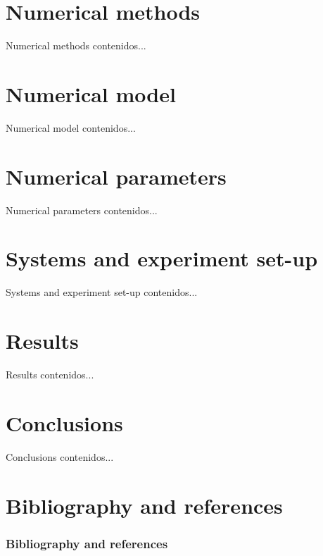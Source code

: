 \documentclass[11pt]{beamer}
\begin{document}
	\section{Numerical methods}
		\begin{frame}{Numerical methods}
		contenidos...
		\end{frame}
	\section{Numerical model}
		\begin{frame}{Numerical model}
		contenidos...
		\end{frame}
	\section{Numerical parameters}
		\begin{frame}{Numerical parameters}
		contenidos...
		\end{frame}
	\section{Systems and experiment set-up}
		\begin{frame}{Systems and experiment set-up}
		contenidos...
		\end{frame}
	\section{Results}
		\begin{frame}{Results}
		contenidos...
		\end{frame}
	\section{Conclusions}
		\begin{frame}{Conclusions}
		contenidos...
		\end{frame}
	\section{Bibliography and references}
		\begin{frame}[allowframebreaks]
		\frametitle{Bibliography and references}
			
			
		\end{frame}
\end{document}

